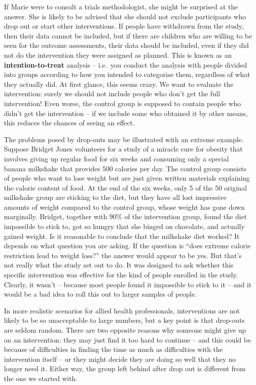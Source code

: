 \documentclass{krantz}
\begin{document}
If Marie were to consult a trials methodologist, she might be surprised at the answer. She is likely to be advised that she should not exclude participants who drop out or start other interventions. If people have withdrawn from the study, then their data cannot be included, but if there are children who are willing to be seen for the outcome assessments, their data should be included, even if they did not do the intervention they were assigned as planned. This is known as an \textbf{intention-to-treat} analysis -- i.e.~you conduct the analysis with people divided into groups according to how you intended to categorise them, regardless of what they actually did. At first glance, this seems crazy. We want to evaluate the intervention: surely we should not include people who don't get the full intervention! Even worse, the control group is supposed to contain people who didn't get the intervention -- if we include some who obtained it by other means, this reduces the chances of seeing an effect.

The problems posed by drop-outs may be illustrated with an extreme example. Suppose Bridget Jones volunteers for a study of a miracle cure for obesity that involves giving up regular food for six weeks and consuming only a special banana milkshake that provides 500 calories per day. The control group consists of people who want to lose weight but are just given written materials explaining the calorie content of food. At the end of the six weeks, only 5 of the 50 original milkshake group are sticking to the diet, but they have all lost impressive amounts of weight compared to the control group, whose weight has gone down marginally. Bridget, together with 90\% of the intervention group, found the diet impossible to stick to, got so hungry that she binged on chocolate, and actually gained weight. Is it reasonable to conclude that the milkshake diet worked? It depends on what question you are asking. If the question is ``does extreme calorie restriction lead to weight loss?'' the answer would appear to be yes. But that's not really what the study set out to do. It was designed to ask whether this specific intervention was effective for the kind of people enrolled in the study. Clearly, it wasn't -- because most people found it impossible to stick to it -- and it would be a bad idea to roll this out to larger samples of people.

In more realistic scenarios for allied health professionals, interventions are not likely to be so unacceptable to large numbers, but a key point is that drop-outs are seldom random. There are two opposite reasons why someone might give up on an intervention: they may just find it too hard to continue -- and this could be because of difficulties in finding the time as much as difficulties with the intervention itself -- or they might decide they are doing so well that they no longer need it. Either way, the group left behind after drop out is different from the one we started with.
\end{document}
